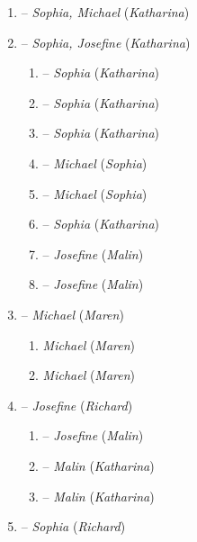 \begin{enumerate}
	\begin{enumerate}[label*=\arabic*.]
	\item {} -- \textit{Sophia, Michael} (\textit{Katharina})
	\item {} -- \textit{Sophia, Josefine} (\textit{Katharina})
		\begin{enumerate}[label*=\arabic*.]
		\item {} -- \textit{Sophia} (\textit{Katharina})
		\item {} -- \textit{Sophia} (\textit{Katharina})
		\item {} -- \textit{Sophia} (\textit{Katharina})
		\item {} -- \textit{Michael} (\textit{Sophia})
		\item {} -- \textit{Michael} (\textit{Sophia})
		\item {} -- \textit{Sophia} (\textit{Katharina})
		\item {} -- \textit{Josefine} (\textit{Malin})
		\item {} -- \textit{Josefine} (\textit{Malin})
		\end{enumerate}
	\item {} -- \textit{Michael} (\textit{Maren})
		\begin{enumerate}[label*=\arabic*.]
		\item {} \textit{Michael} (\textit{Maren})
		\item {} \textit{Michael} (\textit{Maren})
		\end{enumerate}
	\item {} -- \textit{Josefine} (\textit{Richard})
		\begin{enumerate}[label*=\arabic*.]
		\item {} -- \textit{Josefine} (\textit{Malin})
		\item {} -- \textit{Malin} (\textit{Katharina})
		\item {} -- \textit{Malin} (\textit{Katharina})
		\end{enumerate}
	\item {} -- \textit{Sophia} (\textit{Richard})
		\begin{enumerate}[label*=\arabic*.]

\end{enumerate}
\end{enumerate}
\end{enumerate}
